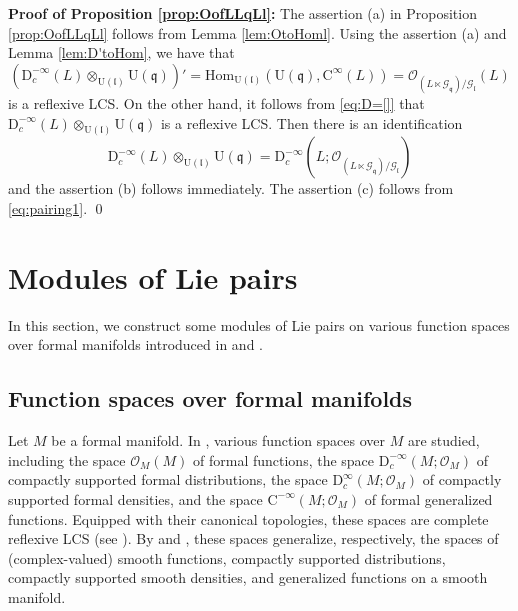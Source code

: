 \documentclass[12pt, a4paper]{amsart}
\newcommand{\CG}{{\mathcal {G}}}
\newcommand{\CO}{{\mathcal {O}}}
\newcommand{\RC}{{\mathrm {C}}}
\newcommand{\RD}{{\mathrm {D}}}
\newcommand{\Ri}{{\mathrm{i}}}
\newcommand{\RU}{{\mathrm {U}}}
\newcommand{\Hom}{{\mathrm{Hom}}}
\newcommand{\q}{\mathfrak q}
\renewcommand{\l}{\mathfrak l}
\newcommand{\be}{\begin {equation}}
\theoremstyle{Theorem}
\theoremstyle{Theorem}
\theoremstyle{Theorem}
\theoremstyle{Theorem}
\theoremstyle{Plain}
\theoremstyle{remark}
\theoremstyle{remark}
\theoremstyle{Definition}
\numberwithin{equation}{section}
\begin{document}
\noindent\textbf{Proof of Proposition \ref{prop:OofLLqLl}:} The assertion (a) in Proposition \ref{prop:OofLLqLl} follows from Lemma \ref{lem:OtoHoml}. 
Using the assertion (a) and Lemma \ref{lem:D'toHom}, we have that \[(\RD^{-\infty}_c(L)\otimes_{\RU(\l)}\RU(\q))'= \Hom_{\RU(\l)}(\RU(\q),\RC^{\infty}(L))=\CO_{(L\ltimes \CG_{\q})/\CG_{\l}}(L)\] is a reflexive LCS. On the other hand, it follows from \eqref{eq:D=[]}  that 
$\RD^{-\infty}_c(L)\otimes_{\RU(\l)}\RU(\q)$ is a reflexive LCS. 
Then there is an identification 
\[\RD^{-\infty}_c(L)\otimes_{\RU(\l)}\RU(\q)=\RD^{-\infty}_c(L;\CO_{(L\ltimes \CG_{\q})/\CG_{\l}})\]
and the assertion (b) follows immediately. The assertion (c) follows from \eqref{eq:pairing1}. 
\qed

\section{Modules of Lie pairs}\label{sec:repofGG}
In this section, we construct some modules of Lie pairs on various function spaces over formal manifolds introduced in \cite{CSW1} and \cite{CSW2}.

\subsection{Function spaces over formal manifolds}

Let $M$ be a formal manifold. 
In \cite{CSW1,CSW2}, various function spaces over $M$ are studied, including 
the space $\CO_M(M)$ of formal functions, 
the space $\RD^{-\infty}_c(M;\CO_M)$ of compactly supported formal distributions, 
the space $\RD^{\infty}_c(M;\CO_M)$ of compactly supported formal densities, 
and the space $\RC^{-\infty}(M;\CO_M)$ of formal generalized functions.
Equipped with their canonical topologies, these spaces are complete reflexive LCS 
(see \cite[Lemma A.10]{CSW2}). 
By \cite[Example 4.2]{CSW1} and \cite[Theorem 1.1]{CSW2}, these spaces generalize, respectively, 
the spaces of (complex-valued) smooth functions, compactly supported distributions, 
compactly supported smooth densities, and generalized functions on a smooth manifold.
\end{document}
